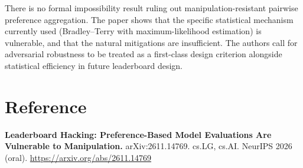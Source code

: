 \documentclass[10pt,twocolumn]{article}
\begin{document}
There is no formal impossibility result ruling out manipulation-resistant pairwise preference aggregation.
The paper shows that the specific statistical mechanism currently used (Bradley--Terry with maximum-likelihood estimation) is vulnerable, and that the natural mitigations are insufficient.
The authors call for adversarial robustness to be treated as a first-class design criterion alongside statistical efficiency in future leaderboard design.

\section*{Reference}
\textbf{Leaderboard Hacking: Preference-Based Model Evaluations Are Vulnerable to Manipulation.}
arXiv:2611.14769. cs.LG, cs.AI. NeurIPS 2026 (oral).
\url{https://arxiv.org/abs/2611.14769}
\end{document}
